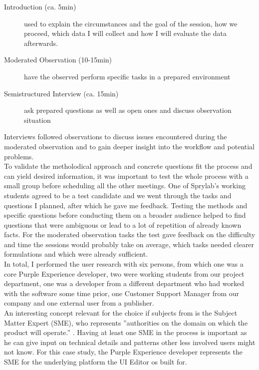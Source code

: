 \begin{description}
  \item [Introduction (ca. 5min)] used to explain the circumstances and the goal of the session, how we proceed, which data I will collect and how I will evaluate the data afterwards.
  \item [Moderated Observation (10-15min)] have the observed perform specific tasks in a prepared environment
  \item [Semistructured Interview (ca. 15min)] ask prepared questions as well as open ones and discuss observation situation
\end{description}
Interviews followed observations to discuss issues encountered during the moderated observation and to gain deeper insight into the workflow and potential problems.
\\
To validate the metholodical approach and concrete questions fit the process and can yield desired information, it was important to test the whole process with a small group before scheduling all the other meetings. One of Sprylab's working students agreed to be a test candidate and we went through the tasks and questions I planned, after which he gave me feedback.
Testing the methods and specific questions before conducting them on a broader audience helped to find questions that were ambiguous or lead to a lot of repetition of already known facts.
For the moderated observation tasks the test gave feedback on the difficulty and time the sessions would probably take on average, which tasks needed clearer formulations and which were already sufficient.
\\
In total, I performed the user research with six persons, from which one was a core Purple Experience developer, two were working students from our project department, one was a developer from a different department who had worked with the software some time prior, one Customer Support Manager from our company and one external user from a publisher.
\\
An interesting concept relevant for the choice if subjects from \cite[p. 41]{AboutFace:2014ys} is the Subject Matter Expert (SME), who represents ''authorities on the domain on which the product will operate.'' \cite[p. 41]{AboutFace:2014ys}. Having at least one SME in the process is important as he can give input on technical details and patterns other less involved users might not know. For this case study, the Purple Experience developer represents the SME for the underlying platform the UI Editor os built for.

